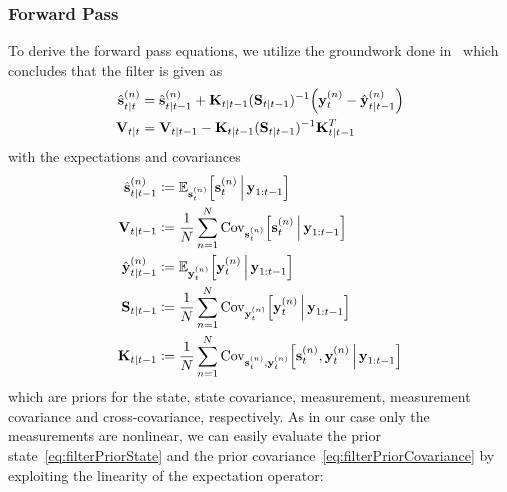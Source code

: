 	\subsubsection{Forward Pass}
		To derive the forward pass equations, we utilize the groundwork done in~\cite{deisenrothProbabilisticPerspectiveGaussian2011} which concludes that the filter is given as
		\begin{align*}
			\hat{\boldsymbol{\mathrm{s}}}_{t \vert t}^{(n)} & = \hat{\boldsymbol{\mathrm{s}}}_{t \vert t - 1}^{(n)} + \boldsymbol{\mathrm{K}}_{t \vert t - 1} (\boldsymbol{\mathrm{S}}_{t \vert t - 1})^{-1} \Big(\boldsymbol{\mathrm{y}}_t^{(n)} - \hat{\boldsymbol{\mathrm{y}}}_{t \vert t - 1}^{(n)}\Big) \\
			\boldsymbol{\mathrm{V}}_{t \vert t}       & = \boldsymbol{\mathrm{V}}_{t \vert t - 1} - \boldsymbol{\mathrm{K}}_{t \vert t - 1} (\boldsymbol{\mathrm{S}}_{t \vert t - 1})^{-1} \boldsymbol{\mathrm{K}}_{t \vert t - 1}^T
		\end{align*}
		with the expectations and covariances
		\begin{align}
			\hat{\boldsymbol{\mathrm{s}}}_{t \vert t - 1}^{(n)} & \coloneqq \mathbb{E}_{\boldsymbol{\mathrm{s}}_t^{(n)}}\Big[\boldsymbol{\mathrm{s}}_t^{(n)} \,\Big\vert\, \boldsymbol{\mathrm{y}}_{1:t - 1}\Big]  \label{eq:filterPriorState}                                                                     \\
			\boldsymbol{\mathrm{V}}_{t \vert t - 1}             & \coloneqq \frac{1}{N} \sum_{n = 1}^{N} \operatorname{Cov}_{\boldsymbol{\mathrm{s}}_t^{(n)}}\!\Big[\boldsymbol{\mathrm{s}}_t^{(n)} \,\Big\vert\, \boldsymbol{\mathrm{y}}_{1:t - 1}\Big]  \label{eq:filterPriorCovariance}                               \\
			\hat{\boldsymbol{\mathrm{y}}}_{t \vert t - 1}^{(n)} & \coloneqq \mathbb{E}_{\boldsymbol{\mathrm{y}}_t^{(n)}}\Big[\boldsymbol{\mathrm{y}}_t^{(n)} \,\Big\vert\, \boldsymbol{\mathrm{y}}_{1:t - 1}\Big]  \label{eq:filterPriorMeas}                                                                      \\
			\boldsymbol{\mathrm{S}}_{t \vert t - 1}             & \coloneqq \frac{1}{N} \sum_{n = 1}^{N} \operatorname{Cov}_{\boldsymbol{\mathrm{y}}_t^{(n)}}\!\Big[\boldsymbol{\mathrm{y}}_t^{(n)} \,\Big\vert\, \boldsymbol{\mathrm{y}}_{1:t - 1}\Big]  \label{eq:filterPriorMeasCov}                                  \\
			\boldsymbol{\mathrm{K}}_{t \vert t - 1}             & \coloneqq \frac{1}{N} \sum_{n = 1}^{N} \operatorname{Cov}_{\boldsymbol{\mathrm{s}}_t^{(n)}, \boldsymbol{\mathrm{y}}_t^{(n)}}\!\Big[\boldsymbol{\mathrm{s}}_t^{(n)}, \boldsymbol{\mathrm{y}}_t^{(n)} \,\Big\vert\, \boldsymbol{\mathrm{y}}_{1:t - 1}\Big]  \label{eq:filterPriorKalman}
		\end{align}
		which are priors for the state, state covariance, measurement, measurement covariance and cross-covariance, respectively. As in our case only the measurements are nonlinear, we can easily evaluate the prior state~\eqref{eq:filterPriorState} and the prior covariance~\eqref{eq:filterPriorCovariance} by exploiting the linearity of the expectation operator:
